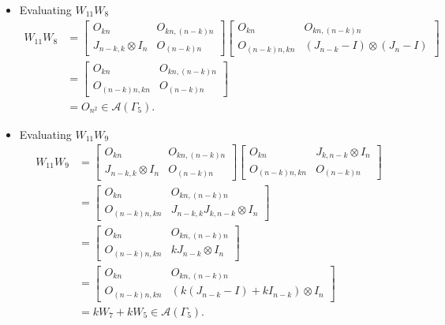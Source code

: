 \begin{itemize}
\item Evaluating $W_{11}W_{8}$
\begin{align*}
    W_{11}W_{8}
    &= \begin{bmatrix}
        O_{kn} & O_{kn, (n-k)n} \\
        J_{n-k, k}\otimes I_n & O_{(n-k)n}
    \end{bmatrix}
    \begin{bmatrix}
        O_{kn} & O_{kn, (n-k)n} \\
        O_{(n-k)n,kn} & (J_{n-k}-I) \otimes (J_n-I)
    \end{bmatrix}\\
    &= \begin{bmatrix}
        O_{kn} & O_{kn, (n-k)n} \\
        O_{(n-k)n,kn} & O_{(n - k)n}
    \end{bmatrix}\\
    &= O_{n^2} \in\mathcal{A}(\Gamma_5).
\end{align*}

\item Evaluating $W_{11}W_{9}$
\begin{align*}
    W_{11}W_{9}
    &= \begin{bmatrix}
        O_{kn} & O_{kn, (n-k)n} \\
        J_{n-k, k}\otimes I_n & O_{(n-k)n}
    \end{bmatrix}
    \begin{bmatrix}
        O_{kn} & J_{k,n-k} \otimes I_n \\
        O_{(n-k)n,kn} & O_{(n-k)n}
    \end{bmatrix}\\
    &= \begin{bmatrix}
        O_{kn} & O_{kn, (n-k)n} \\
        O_{(n-k)n,kn} & J_{n-k, k}J_{k,n-k} \otimes I_n
    \end{bmatrix}\\
    &= \begin{bmatrix}
        O_{kn} & O_{kn, (n-k)n} \\
        O_{(n-k)n,kn} & kJ_{n-k} \otimes I_n
    \end{bmatrix}\\
    &= \begin{bmatrix}
        O_{kn} & O_{kn, (n-k)n} \\
        O_{(n-k)n,kn} & (k(J_{n-k}-I)+kI_{n-k}) \otimes I_n
    \end{bmatrix}\\
    &= kW_7 + kW_5\in\mathcal{A}(\Gamma_5).
\end{align*}


\end{itemize}
